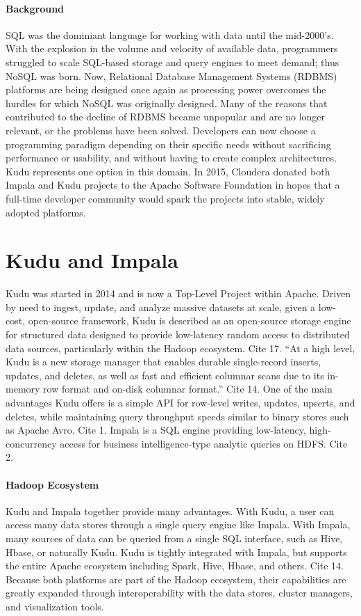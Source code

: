 \paragraph{Background}
SQL was the dominiant language for working with data until the
mid-2000's.  With the explosion in the volume and velocity of
available data, programmers struggled to scale SQL-based storage and
query engines to meet demand; thus NoSQL was born. Now, Relational
Database Management Systems (RDBMS) platforms are being designed once
again as processing power overcomes the hurdles for which NoSQL was originally designed. Many of the reasons that contributed to the decline of RDBMS became unpopular and are no longer relevant, or the problems have been solved. Developers can now choose a programming paradigm depending on their specific needs without sacrificing performance or usability, and without having to create complex architectures.  Kudu represents one option in this domain. In 2015, Cloudera donated both Impala and Kudu projects to the Apache Software Foundation in hopes that a full-time developer community would spark the projects into stable, widely adopted platforms. 

\section{Kudu and Impala}
Kudu was started in 2014 and is now a Top-Level Project within Apache. Driven by need to ingest, update, and analyze massive datasets at scale, given a low-cost, open-source framework, Kudu is described as an open-source storage engine for structured data designed to provide low-latency random access to distributed data sources, particularly within the Hadoop ecosystem. Cite 17. ``At a high level, Kudu is a new storage manager that enables durable single-record inserts, updates, and deletes, as well as fast and efficient columnar scans due to its in-memory row format and on-disk columnar format.''  Cite 14. One of the main advantages Kudu offers is a simple API for row-level writes, updates, upserts, and deletes, while maintaining query throughput speeds similar to binary stores such as Apache Avro. Cite 1. Impala is a SQL engine providing low-latency, high-concurrency access for business intelligence-type analytic queries on HDFS.  Cite 2. 

\paragraph{Hadoop Ecosystem}
Kudu and Impala together provide many advantages.  With Kudu, a user can access many data stores through a single query engine like Impala. With Impala, many sources of data can be queried from a single SQL interface, such as Hive, Hbase, or naturally Kudu. Kudu is tightly integrated with Impala, but supports the entire Apache ecosystem including Spark, Hive, Hbase, and others. Cite 14. Because both platforms are part of the Hadoop ecosystem, their capabilities are greatly expanded through interoperability with the data stores, cluster managers, and visualization tools. 


